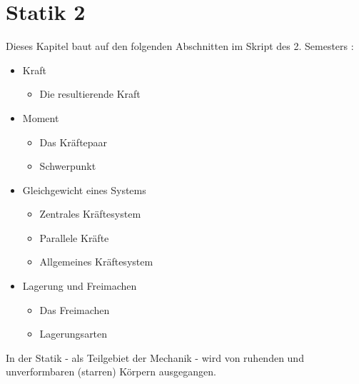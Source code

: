 \chapter{Statik 2}

Dieses Kapitel baut auf den folgenden Abschnitten im Skript des 2. Semesters \cite{schnidrig_physik_2026}:

\begin{minipage}[t]{.38\textwidth}
    \begin{itemize}
        \item Kraft
        \begin{itemize}
            \item Die resultierende Kraft
        \end{itemize}
        \item Moment
        \begin{itemize}
            \item Das Kräftepaar
            \item Schwerpunkt
        \end{itemize}
    \end{itemize}
\end{minipage}
\hspace{.1\textwidth}
\begin{minipage}[t]{.45\textwidth}
    \begin{itemize}
        \item Gleichgewicht eines Systems
        \begin{itemize}
            \item Zentrales Kräftesystem
            \item Parallele Kräfte
            \item Allgemeines Kräftesystem
        \end{itemize}
        \item Lagerung und Freimachen
        \begin{itemize}
            \item Das Freimachen
            \item Lagerungsarten
        \end{itemize}
    \end{itemize}
\end{minipage}

\begin{infobox}
    In der Statik - als Teilgebiet der Mechanik - wird von ruhenden und unverformbaren
    (starren) Körpern ausgegangen.
\end{infobox}

